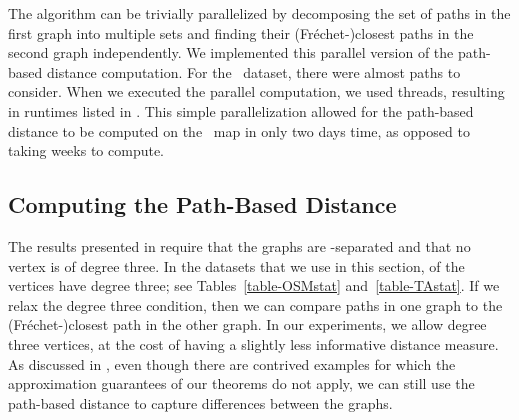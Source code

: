 The algorithm can be trivially parallelized by decomposing the set of paths in
the first graph into
multiple sets and finding their (Fr\'echet-)closest paths in the
second graph independently. We implemented this parallel version of the
path-based distance computation.
For the \blarge\ dataset, there were almost  paths to consider.  When
we executed the parallel computation, we used  threads, resulting in
runtimes listed in .
This simple
parallelization allowed for the path-based distance to be computed on the
\blarge\ map in only two days time, as opposed to taking weeks to compute.












\subsection{Computing the Path-Based Distance}
\label{subsec-goodVertices}
The results presented in  require that the graphs are
-separated and that no vertex is of degree three. 
In the datasets that
we use in this section,  of the vertices have degree three; see 
Tables~\ref{table-OSMstat} and~\ref{table-TAstat}.  If we
relax the degree three condition, then we can compare paths in one graph to
the (Fr\'echet-)closest path in the other graph.   In our experiments, we 
allow degree three vertices, at the cost of having a slightly less informative 
distance measure.
As discussed in , even though there are contrived examples for which the approximation guarantees of our
theorems do not apply, we can still use the path-based distance to
capture differences between the graphs. 


